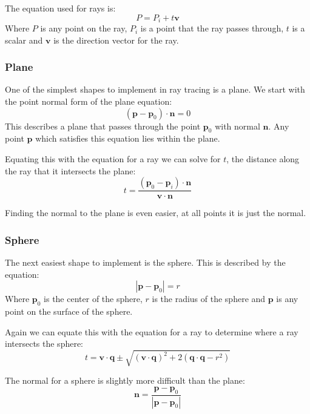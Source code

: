     \noindent The equation used for rays is:
    \[ P = P_i + t \mathbf{v} \]
    Where $P$ is any point on the ray, $P_i$ is a point that the ray passes
    through, $t$ is a scalar and $\mathbf{v}$ is the direction vector for the
    ray.

    \subsubsection{Plane}
      One of the simplest shapes to implement in ray tracing is a plane.  We
      start with the point normal form of the plane equation:
      \[ \left( \mathbf{p} - \mathbf{p}_0 \right) \cdot \mathbf{n} = 0 \]
      This describes a plane that passes through the point $\mathbf{p}_0$ with
      normal $\mathbf{n}$.  Any point $\mathbf{p}$ which satisfies this equation
      lies within the plane.

      Equating this with the equation for a ray we can solve for $t$, the
      distance along the ray that it intersects the plane:
      \[ t  = \frac{\left( \mathbf{p}_0 - \mathbf{p}_i \right) \cdot
         \mathbf{n}}{\mathbf{v} \cdot \mathbf{n}} \]

      Finding the normal to the plane is even easier, at all points it is just
      the normal.

    \subsubsection{Sphere}
      The next easiest shape to implement is the sphere.  This is described by
      the equation:
      \[ \left| \mathbf{p} - \mathbf{p}_0 \right| = r \]
      Where $\mathbf{p}_0$ is the center of the sphere, $r$ is the radius of the
      sphere and $\mathbf{p}$ is any point on the surface of the sphere.

      Again we can equate this with the equation for a ray to determine where a
      ray intersects the sphere:
      \[ t = \mathbf{v} \cdot \mathbf{q} \pm \sqrt{\left(\mathbf{v} \cdot
         \mathbf{q}\right)^2 + 2 \left(\mathbf{q} \cdot \mathbf{q} - r^2\right)}
         \]
      
      The normal for a sphere is slightly more difficult than the plane:
      \[ \mathbf{n} = \frac{\mathbf{p} - \mathbf{p}_0}{\left| \mathbf{p} -
         \mathbf{p}_0 \right|} \]

